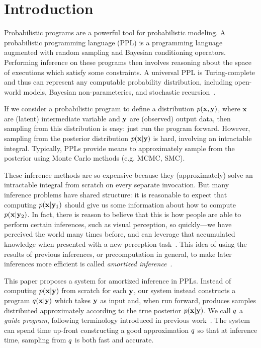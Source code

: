 \section{Introduction}
\label{sec:introduction}


Probabilistic programs are a powerful tool for probabilistic modeling. A probabilistic programming language (PPL) is a programming language augmented with random sampling and Bayesian conditioning operators. Performing inference on these programs then involves reasoning about the space of executions which satisfy some constraints. A universal PPL is Turing-complete and thus can represent any computable probability distribution, including open-world models, Bayesian non-parameterics, and stochastic recursion~\cite{Church,Venture,Anglican}.


If we consider a probabilistic program to define a distribution $p(\mathbf{x}, \mathbf{y})$, where $\mathbf{x}$ are (latent) intermediate variable and $\mathbf{y}$ are (observed) output data, then sampling from this distribution is easy: just run the program forward. However, sampling from the posterior distribution $p(\mathbf{x} | \mathbf{y})$ is hard, involving an intractable integral. Typically, PPLs provide means to approximately sample from the posterior using Monte Carlo methods (e.g. MCMC, SMC).


These inference methods are so expensive because they (approximately) solve an intractable integral from scratch on every separate invocation.
But many inference problems have shared structure: it is reasonable to expect that computing $p(\mathbf{x} | \mathbf{y}_1)$ should give us some information about how to compute $p(\mathbf{x} | \mathbf{y}_2)$.
In fact, there is reason to believe that this is how people are able to perform certain inferences, such as visual perception, so quickly---we have perceived the world many times before, and can leverage that accumulated knowledge when presented with a new perception task~\cite{AmortizedInference}.
This idea of using the results of previous inferences, or precomputation in general, to make later inferences more efficient is called \emph{amortized inference}~\cite{AmortizedInference,StochasticInverses}.


This paper proposes a system for amortized inference in PPLs. Instead of computing $p(\mathbf{x} | \mathbf{y})$ from scratch for each $\mathbf{y}$, our system instead constructs a program $q(\mathbf{x} | \mathbf{y})$ which takes $\mathbf{y}$ as input and, when run forward, produces samples distributed approximately according to the true posterior $p(\mathbf{x} | \mathbf{y})$.
We call $q$ a \emph{guide program}, following terminology introduced in previous work~\cite{GuidePrograms}.
The system can spend time up-front constructing a good approximation $q$ so that at inference time, sampling from $q$ is both fast and accurate.

